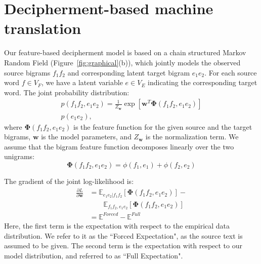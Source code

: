 \section{Decipherment-based machine translation}
Our feature-based decipherment model is based on a chain structured Markov Random Field (Figure~\ref{fig:graphical}(b)), which jointly models the observed source bigrams $f_1f_2$ and corresponding latent target bigram $e_1 e_2$. 
For each source word $f \in V_F$, we have a latent variable $e \in V_E$ indicating the corresponding target word.
The joint probability distribution:
\begin{multline}
p(f_1 f_2, e_1 e_2) = \frac{1}{Z_{\mathbf{w}}}  \exp{\left[ \mathbf{w}^T\mathbf{\Phi}(f_1f_2, e_1e_2) \right]}  \\ p(e_1e_2),
\end{multline}
where $\mathbf{\Phi}(f_1f_2, e_1e_2)$ is the feature function for the given source and the target bigrams, $\mathbf{w}$ is the model parameters, and $Z_{\mathbf{w}}$ is the normalization term. We assume that the bigram feature function decomposes linearly over the two unigrams:
\begin{equation}
\mathbf{\Phi}(f_1f_2, e_1e_2) = \phi(f_1, e_1) + \phi(f_2, e_2)
\end{equation}

The gradient of the joint log-likelihood is:
\begin{align*}
 \label{eq:grad}
\frac{\partial L} { \partial \mathbf{w}} &=    \mathbb{E}_{e_1 e_2|f_1f_2} \left[ \mathbf{\Phi}(f_1 f_2, e_1 e_2) \right  ] - \\
   &\qquad \mathbb{E}_{f_1f_2,e_1e_2} \left[ \mathbf{\Phi}(f_1 f_2, e_1 e_2) \right  ] \\
&=  \mathbb{E}^{Forced} - \mathbb{E}^{Full}
\end{align*}
Here, the first term is the expectation with respect to the empirical data distribution. 
We refer to it as the ``Forced Expectation", as the source text is assumed to be given. 
The second term is the expectation with respect to our model distribution, and referred to as ``Full Expectation".

